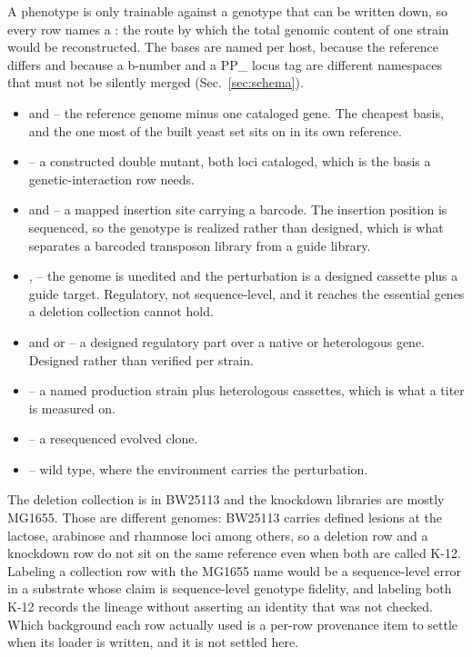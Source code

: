 A phenotype is only trainable against a genotype that can be written down, so every row
names a : the route by which the total genomic content of one strain
would be reconstructed. The bases are named per host, because the reference differs and
because a b-number and a PP\_ locus tag are different namespaces that must not be
silently merged (Sec.~\ref{sec:schema}).

\begin{itemize}[leftmargin=1.2em,itemsep=1pt,topsep=2pt]
  \item {} and  -- the reference genome minus one
    cataloged gene. The cheapest basis, and the one most of the built yeast set sits on
    in its own reference.
  \item {} -- a constructed double mutant, both loci cataloged, which
    is the basis a genetic-interaction row needs.
  \item {} and  -- a mapped insertion site
    carrying a barcode. The insertion position is sequenced, so the genotype is realized
    rather than designed, which is what separates a barcoded transposon library from a
    guide library.
  \item {},  -- the genome is unedited and the
    perturbation is a designed cassette plus a guide target. Regulatory, not
    sequence-level, and it reaches the essential genes a deletion collection cannot hold.
  \item {} and  or
     -- a designed regulatory part over a native or heterologous gene.
    Designed rather than verified per strain.
  \item {} -- a named production strain plus heterologous
    cassettes, which is what a titer is measured on.
  \item {} -- a resequenced evolved clone.
  \item {} -- wild type, where the environment carries the
    perturbation.
\end{itemize}

 The deletion collection is in BW25113 and the knockdown libraries are mostly
MG1655. Those are different genomes: BW25113 carries defined lesions at the lactose,
arabinose and rhamnose loci among others, so a deletion row and a knockdown row do not
sit on the same reference even when both are called K-12. Labeling a collection row with
the MG1655 name would be a sequence-level error in a substrate whose claim is
sequence-level genotype fidelity, and labeling both K-12 records the lineage without
asserting an identity that was not checked. Which background each row actually used is a
per-row provenance item to settle when its loader is written, and it is not settled here.

